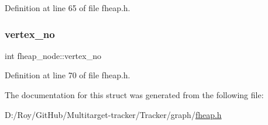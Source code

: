 Definition at line 65 of file fheap.\+h.

\mbox{\label{structfheap__node_a830c8feb141fe01db7e4cfab6396ae0d}} 
\subsubsection{\texorpdfstring{vertex\+\_\+no}{vertex\_no}}
{\footnotesize\ttfamily int fheap\+\_\+node\+::vertex\+\_\+no}



Definition at line 70 of file fheap.\+h.



The documentation for this struct was generated from the following file\+:\begin{DoxyCompactItemize}
\item 
D\+:/\+Roy/\+Git\+Hub/\+Multitarget-\/tracker/\+Tracker/graph/\mbox{\hyperlink{fheap_8h}{fheap.\+h}}\end{DoxyCompactItemize}

